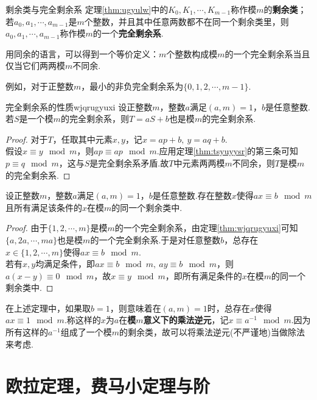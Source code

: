 \documentclass[lang=cn, zihao=5]{elegantbook}
\begin{document}
\begin{definition}{剩余类与完全剩余系}
	定理\ref{thm:ugyulw}中的$K_0,K_1, \cdots ,K_{m-1}$称作模$m$的\textbf{剩余类}；若$a_0,a_1,\cdots ,a_{m-1}$是$m$个整数，并且其中任意两数都不在同一个剩余类里，则$a_0,a_1,\cdots ,a_{m-1}$称作模$m$的一个\textbf{完全剩余系}.
\end{definition}
\begin{remark}
	用同余的语言，可以得到一个等价定义：$m$个整数构成模$m$的一个完全剩余系当且仅当它们两两模$m$不同余.
\end{remark}

例如，对于正整数$m$，最小的非负完全剩余系为$\{ 0,1,2,\cdots ,m-1 \}$.

\begin{theorem}{完全剩余系的性质}{wjqrugyuxi}
	设正整数$m$，整数$a$满足$(a,m)=1$，$b$是任意整数.若$S$是一个模$m$的完全剩余系，则$T=aS+b$也是模$m$的完全剩余系.
\end{theorem}
\begin{proof}
	对于$T$，任取其中元素$x,y$，记$x=ap+b,~y=aq+b$. \\
	假设$x \equiv y \mod m$，则$ap \equiv ap \mod m$.应用定理\ref{thm:tsyuyysr}的第三条可知$p \equiv q \mod m$，这与$S$是完全剩余系矛盾.故$T$中元素两两模$m$不同余，则$T$是模$m$的完全剩余系.
\end{proof}

\begin{theorem}
	设正整数$m$，整数$a$满足$(a,m)=1$，$b$是任意整数.存在整数$x$使得$ax \equiv b \mod m$且所有满足该条件的$x$在模$m$的同一个剩余类中.
\end{theorem}
\begin{proof}
	由于$\{ 1,2,\cdots ,m \}$是模$m$的一个完全剩余系，由定理\ref{thm:wjqrugyuxi}可知$\{ a,2a,\cdots ,ma \}$也是模$m$的一个完全剩余系.于是对任意整数$b$，总存在$x \in \{ 1,2,\cdots ,m \}$使得$ax \equiv b \mod m$. \\
	若有$x,y$均满足条件，即$ax \equiv b \mod m,~ay \equiv b \mod m$，则$a(x-y) \equiv 0 \mod m$，故$x \equiv y \mod m$，即所有满足条件的$x$在模$m$的同一个剩余类中.
\end{proof}

在上述定理中，如果取$b=1$，则意味着在$(a,m)=1$时，总存在$x$使得$ax \equiv 1 \mod m$.称这样的$x$为$a$在\textbf{模$m$意义下的乘法逆元}，记$x \equiv a^{-1} \mod m$.因为所有这样的$a^{-1}$组成了一个模$m$的剩余类，故可以将乘法逆元(不严谨地)当做除法来考虑.

\section{欧拉定理，费马小定理与阶}
\end{document}
